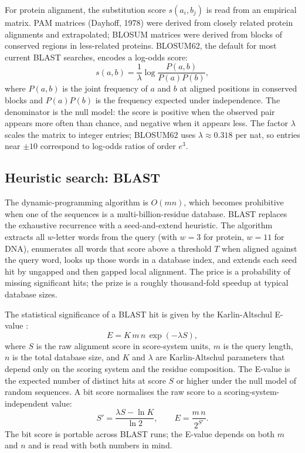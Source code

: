 For protein alignment, the substitution score $s(a_i, b_j)$ is read from
an empirical matrix. PAM matrices (Dayhoff, 1978) were derived from
closely related protein alignments and extrapolated; BLOSUM matrices
\cite{paper:v6c11-henikoff-blosum-1992} were derived from blocks of
conserved regions in less-related proteins. BLOSUM62, the default for
most current BLAST searches, encodes a log-odds score:
\[
s(a, b) = \frac{1}{\lambda} \log \frac{P(a, b)}{P(a) P(b)},
\]
where $P(a, b)$ is the joint frequency of $a$ and $b$ at aligned
positions in conserved blocks and $P(a) P(b)$ is the frequency expected
under independence. The denominator is the null model: the score is
positive when the observed pair appears more often than chance, and
negative when it appears less. The factor $\lambda$ scales the matrix
to integer entries; BLOSUM62 uses $\lambda \approx 0.318$ per nat, so
entries near $\pm 10$ correspond to log-odds ratios of order $e^3$.

\subsection{Heuristic search: BLAST}

The dynamic-programming algorithm is $O(mn)$, which becomes prohibitive
when one of the sequences is a multi-billion-residue database. BLAST
\cite{paper:v6c11-altschul-blast-1990} replaces the exhaustive
recurrence with a seed-and-extend heuristic. The algorithm extracts
all $w$-letter words from the query (with $w=3$ for protein, $w=11$
for DNA), enumerates all words that score above a threshold $T$ when
aligned against the query word, looks up those words in a database
index, and extends each seed hit by ungapped and then gapped local
alignment. The price is a probability of missing significant hits;
the prize is a roughly thousand-fold speedup at typical database
sizes.

The statistical significance of a BLAST hit is given by the
Karlin-Altschul E-value \cite{paper:v6c11-karlin-altschul-1990}:
\[
E = K \, m \, n \, \exp(-\lambda S),
\]
where $S$ is the raw alignment score in score-system units, $m$ is the
query length, $n$ is the total database size, and $K$ and $\lambda$
are Karlin-Altschul parameters that depend only on the scoring system
and the residue composition. The E-value is the expected number of
distinct hits at score $S$ or higher under the null model of random
sequences. A bit score normalises the raw score to a scoring-system-
independent value:
\[
S' = \frac{\lambda S - \ln K}{\ln 2}, \qquad E = \frac{m\,n}{2^{S'}}.
\]
The bit score is portable across BLAST runs; the E-value depends on
both $m$ and $n$ and is read with both numbers in mind.

